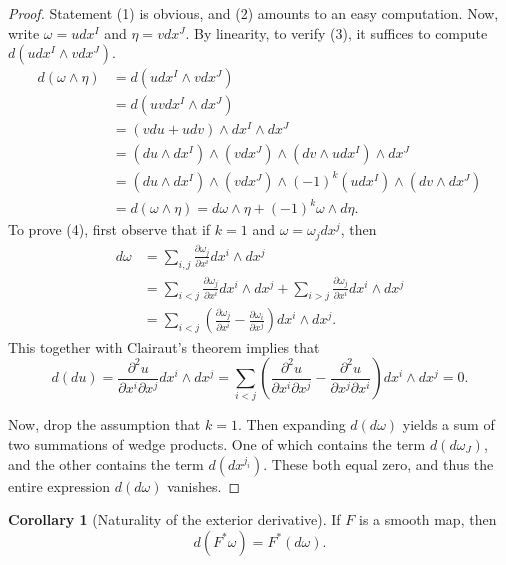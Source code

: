 \documentclass[10pt,letterpaper,cm]{nupset}
\theoremstyle{definition}
\theoremstyle{theorem}
\newtheorem{corollary}[definition]{Corollary}
\theoremstyle{remark}
\newcommand{\1}{\mathbf{1}}
\newcommand{\0}{\vec 0}
\begin{document}
\begin{proof}
Statement (1) is obvious, and (2) amounts to an easy computation. Now, write $\omega = udx^I$ and $\eta = v dx^J$. By linearity, to verify (3), it suffices to compute $d(udx^I \wedge v dx^J)$. 
\begin{align*}
 d(\omega \wedge \eta) &= d(udx^I \wedge vdx^J) \\
& = d(uvdx^I \wedge dx^J)
\\ & = (vdu + udv) \wedge dx^I \wedge dx^J
\\ & = (du \wedge dx^I) \wedge (v dx^J) \wedge (dv \wedge u dx^I) \wedge dx^J
\\ & = (du \wedge dx^I) \wedge (v dx^J) \wedge ({-1})^k(udx^I) \wedge (dv \wedge dx^J)
\\ & = d( \omega \wedge \eta) = d \omega \wedge \eta + ({-1})^k\omega \wedge d \eta .
\end{align*}
To prove (4), first observe that if $k=1$ and  $\omega = \omega_jdx^j$, then 
\begin{align*}
d \omega & =   \sum_{i, j}\frac{\partial{\omega_j}}{\partial{x^i}}dx^i \wedge dx^j 
\\ & = \sum_{i< j}\frac{\partial{\omega_j}}{\partial{x^i}}dx^i \wedge dx^j + \sum_{i>j}\frac{\partial{\omega_j}}{\partial{x^i}}dx^i \wedge dx^j 
\\ & =\sum_{i<j}\left(\frac{\partial{\omega_j}}{\partial{x^i}} - \frac{\partial{\omega_i}}{\partial{x^j}}\right)dx^i \wedge dx^j.
\end{align*} This together with Clairaut's theorem implies that  $$d(du) =\frac{\partial^2{u}}{\partial{x^i}\partial{x^j}}dx^i \wedge dx^j = \sum_{i<j}\left( \frac{\partial^2{u}}{\partial{x^i}\partial{x^j}} - \frac{\partial^2{u}}{\partial{x^j}\partial{x^i}}\right)dx^i \wedge dx^j = 0.  $$ 

Now, drop the assumption that $k=1$. Then expanding $d(d\omega)$ yields a sum of two summations of wedge products. One of which contains the term $d(d\omega_J)$, and the other contains the term $d(dx^{j_i})$. These both equal zero, and thus the entire expression $d(d\omega)$ vanishes.
\end{proof}

\begin{corollary}[Naturality of the exterior derivative]\label{natural}
If $F$ is a smooth map, then $$d(F^{\ast} \omega) = F^{\ast}(d \omega).$$
\end{corollary}
\end{document}
